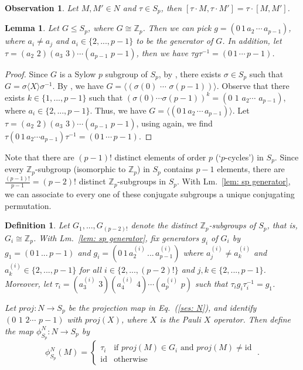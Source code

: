 \documentclass[aps,pra,letterpaper,onrcolumn,nofootinbib,notitlepage,longbibliography]{revtex4-1}
\newtheorem{lemma}{Lemma}
\newtheorem{definition}{Definition}
\newtheorem{obv}{Observation}
\newcommand{\id}{\mathrm{id}}
\newcommand{\zz}{\mathbb Z}
\newcommand{\Z}{\mathbb Z}
\begin{document}
\begin{obv}{\label{obv_comm}}
    Let $M,M'\in N$ and $\tau\in S_p$, then $[\tau\cdot M,\tau\cdot M']=\tau\cdot[M,M']$.
\end{obv}

\begin{lemma}{\label{lem: sp generator}}
    Let $G\leq S_p$, where $G\cong \Z_p$. Then we can pick $g=(0\,1\,a_2\,\cdots\,a_{p-1})$, where $a_i\neq a_j$ and $a_i\in\{2,...,p-1\}$ to be the generator of $G$. In addition, let $\tau=(a_2\,\,2)(a_3\,\,3)\cdots(a_{p-1}\,\,p-1)$, then we have $\tau g \tau^{-1}=(0\,1\,\cdots\,p-1)$.
\end{lemma}

\begin{proof}
    Since $G$ is a Sylow $p$ subgroup of $S_p$, by \cite[Sylow's Theorem]{dummit2004abstract}, there exists $\sigma\in S_p$ such that $G=\sigma \langle X\rangle\sigma^{-1}$. By \cite[Proposition 10]{dummit2004abstract}, %
    we have $G=\langle (\sigma(0)\,\,\cdots\,\,\sigma(p-1))\rangle$. Observe that there exists $k\in\{1,...,p-1\}$ such that $(\sigma(0)\cdots\sigma(p-1))^k=(0\,\,1\,\,a_2\cdots \,\,a_{p-1})$, where $a_i\in\{2,...,p-1\}$. Thus, we have $G=\langle (0\,1\,a_2\,\cdots\,a_{p-1})\rangle$. Let $\tau=(a_2\,\,2)(a_3\,\,3)\cdots(a_{p-1}\,\,p-1)$, using \cite[Proposition 10]{dummit2004abstract} again, %
    we find $\tau (0\,1\,a_2\cdots a_{p-1})\tau^{-1}=(0\,1\,\cdots\,p-1)$.
\end{proof}

Note that there are $(p-1)!$ distinct elements of order $p$ (`$p$-cycles') in $S_p$. Since every $\zz_p$-subgroup (isomorphic to $\Z_p$) in $S_p$ contains $p-1$ elements, there are $\frac{(p-1)!}{p-1}=(p-2)!$ distinct $\Z_p$-subgroups in $S_p$. With Lm.~\ref{lem: sp generator}, we can associate to every one of these conjugate subgroups a unique conjugating permutation.

\begin{definition}{\label{defn: tildeK_sp}}
    Let $G_1,...,G_{(p-2)!}$ denote the distinct $\zz_p$-subgroups of $S_p$, that is, $G_i\cong \Z_p$. With Lm.~\ref{lem: sp generator}, fix generators $g_i$ of $G_i$ by $g_1=(0\,1\,...\,p-1)$ and $g_i=(0\,1\,a^{(i)}_2\,...\,a^{(i)}_{p-1})$ where $a^{(i)}_j\neq a^{(i)}_k$ and $a^{(i)}_k\in\{2,...,p-1\}$ for all $i\in \{2,...,(p-2)!\}$ and $j,k\in\{2,...,p-1\}$. Moreover, let $\tau_i=(a^{(i)}_3\,\,3)(a^{(i)}_4\,\,4)\cdots(a^{(i)}_p\,\,p)$ such that $\tau_i g_i \tau^{-1}_i=g_1$.
    
    Let $proj: N\to S_p$ be the projection map in Eq.~(\ref{ses: N}), and identify $(0\,\,1\,\,2\cdots\,\,p-1)$ with $proj(X)$, where $X$ is the Pauli $X$ operator. Then define the map $\phi^N_{S_p}:N\to S_p$ by
    $$
    \phi^N_{S_p}(M) = \begin{cases}
      \tau_i & \text{if $proj(M)\in G_i$ and $proj(M)\neq\id$} \\
      \id &  \text{otherwise}
    \end{cases}\; .
    $$
\end{definition}
\end{document}
